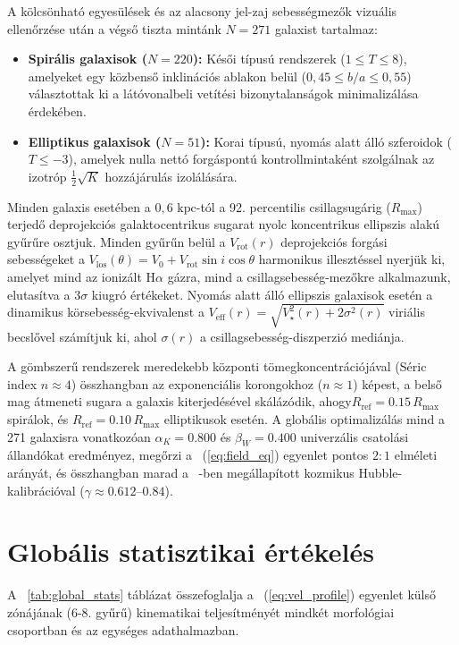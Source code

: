 \documentclass[11pt,a4paper]{article}
\begin{document}
A kölcsönható egyesülések és az alacsony jel-zaj sebességmezők vizuális ellenőrzése után a végső tiszta mintánk $N = 271$ galaxist tartalmaz:
\begin{itemize}
\item \textbf{Spirális galaxisok ($N = 220$):} Késői típusú rendszerek ($1 \le T \le 8$), amelyeket egy közbenső inklinációs ablakon belül ($0,45 \le b/a \le 0,55$) választottak ki a látóvonalbeli vetítési bizonytalanságok minimalizálása érdekében.
\item \textbf{Elliptikus galaxisok ($N = 51$):} Korai típusú, nyomás alatt álló szferoidok ($T \le -3$), amelyek nulla nettó forgáspontú kontrollmintaként szolgálnak az izotróp $\frac{1}{2}\sqrt{K}$ hozzájárulás izolálására.
\end{itemize}

Minden galaxis esetében a $0,6\text{ kpc}$-tól a 92. percentilis csillagsugárig ($R_{\max}$) terjedő deprojekciós galaktocentrikus sugarat nyolc koncentrikus ellipszis alakú gyűrűre osztjuk. Minden gyűrűn belül a $V_{\mathrm{rot}}(r)$ deprojekciós forgási sebességeket a $V_{\mathrm{los}}(\theta) = V_0 + V_{\mathrm{rot}}\sin i \cos\theta$ harmonikus illesztéssel nyerjük ki, amelyet mind az ionizált H$\alpha$ gázra, mind a csillagsebesség-mezőkre alkalmazunk, elutasítva a $3\sigma$ kiugró értékeket. Nyomás alatt álló ellipszis galaxisok esetén a dinamikus körsebesség-ekvivalenst a $V_{\mathrm{eff}}(r) = \sqrt{V_{\star}^2(r) + 2\sigma^2(r)}$ viriális becslővel számítjuk ki, ahol $\sigma(r)$ a csillagsebesség-diszperzió mediánja.

A gömbszerű rendszerek meredekebb központi tömegkoncentrációjával (Séric index $n \approx 4$) összhangban az exponenciális korongokhoz ($n \approx 1$) képest, a belső mag átmeneti sugara a galaxis kiterjedésével skálázódik, ahogy$R_{\mathrm{ref}} = 0.15\,R_{\max}$ spirálok, és $R_{\mathrm{ref}} = 0.10\,R_{\max}$ elliptikusok esetén. A globális optimalizálás mind a 271 galaxisra vonatkozóan $\alpha_K = 0.800$ és $\beta_W = 0.400$ univerzális csatolási állandókat eredményez, megőrzi a ~(\ref{eq:field_eq}) egyenlet pontos $2:1$ elméleti arányát, és összhangban marad a ~\cite{Takacs2026}-ben megállapított kozmikus Hubble-kalibrációval ($\gamma \approx 0.612\text{--}0.84$).

\section{Globális statisztikai értékelés}

A ~\ref{tab:global_stats} táblázat összefoglalja a ~(\ref{eq:vel_profile}) egyenlet külső zónájának (6-8. gyűrű) kinematikai teljesítményét mindkét morfológiai csoportban és az egységes adathalmazban.
\end{document}
